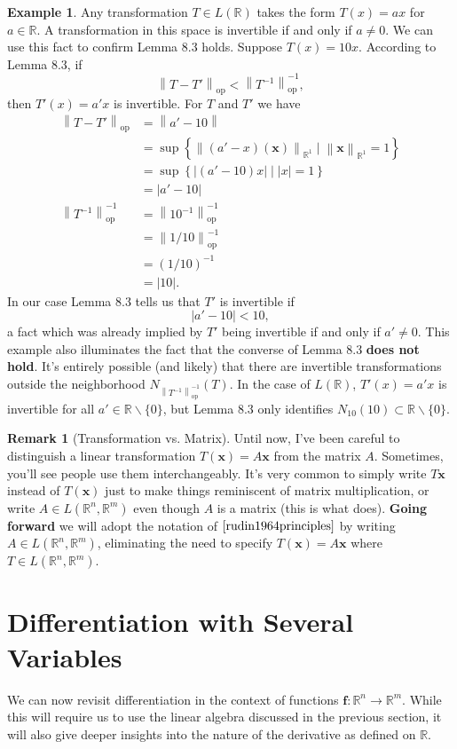 \documentclass{article}
\newcommand{\R}{\mathbb{R}}
\newcommand{\x}{\mathbf{x}}
\newcommand{\f}{\mathbf{f}}
\newcommand{\norm}[1]{\left\lVert#1\right\rVert}
\newcommand{\normop}[1]{\left\lVert#1\right\rVert_\text{op}}
\theoremstyle{definition}
\newtheorem{example}{Example}[section]
\newtheorem{remark}{Remark}[section]
\begin{document}
	\begin{example}
		Any transformation $ T\in L(\R) $ takes the form $ T(x)=ax $ for $ a\in \R $. A transformation in this space is invertible if and only if $ a\neq 0 $. We can use this fact to confirm Lemma 8.3 holds. Suppose $ T(x)= 10x $. According to Lemma 8.3, if $$\normop{T-T'}<\normop{T^{-1}}^{-1}   ,$$ then $ T'(x)=a'x $ is invertible. For $ T $ and $ T' $ we have 
		\begin{align*}
			\normop{T-T'} & = \norm{a' - 10}\\ & =  \sup\left\{\norm{(a'-x)(\x)}_{\R^1}\mid \norm{\x}_{\R^1} = 1\right\} \\
			& =  \sup\left\{|(a'-10)x|\mid |x|=1\right\}\\ & = |a'-10|\\
			\normop{T^{-1}}^{-1} & = \normop{10^{-1}}^{-1} \\
			& = \normop{1/10}^{-1} \\
			& = (1/10)^{-1}\\
			& = |10|. 
		\end{align*}
		In our case Lemma 8.3 tells us that $ T' $ is invertible if $$ |a' - 10| < 10,$$ a fact which was already implied by $ T' $ being invertible if and only if $ a'\neq 0 $. This example also illuminates the fact that the converse of Lemma 8.3 \textbf{does not hold}. It's entirely possible (and likely) that there are invertible transformations outside the neighborhood $N_{\normop{T^{-1}}^{-1}}(T) $. In the case of $ L(\R) $, $ T'(x)=a'x $ is invertible for all $ a'\in \R\backslash\{0\} $, but Lemma 8.3 only identifies $ N_{10}(10)\subset\R\backslash\{0\}  $.  
	\end{example}
	\begin{remark}[Transformation vs. Matrix]
		Until now, I've been careful to distinguish a linear transformation $ T(\x)=A\x $ from the matrix $ A $. Sometimes, you'll see people use them interchangeably. It's very common to simply write $ T\x $ instead of $ T(\x) $ just to make things reminiscent of matrix multiplication, or write $ A\in L(\R^n, \R^m) $ even though $ A $ is a matrix (this is what \cite{rudin1964principles} does). \textbf{Going forward} we will adopt the notation of $ \cite{rudin1964principles} $ by writing $ A\in L(\R^n,\R^m) $, eliminating the need to specify $ T(\x)=A\x $ where $ T\in L(\R^n,\R^m) $. 
	\end{remark}
	\section{Differentiation with Several Variables}
	We can now revisit differentiation in the context of functions $ \f:\R^n\to\R^m $. While this will require us to use the linear algebra discussed in the previous section, it will also give deeper insights into the nature of the derivative as defined on $ \R $. 
\end{document}
